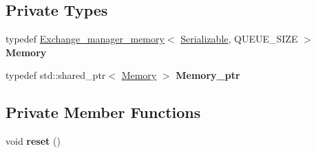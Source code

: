 \subsection*{Private Types}
\begin{DoxyCompactItemize}
\item 
\mbox{\label{classshared__memory_1_1Exchange__manager__consumer_a1699ba86d1d5b943d428fc1b391abd42}} 
typedef \hyperlink{classshared__memory_1_1internal_1_1Exchange__manager__memory}{Exchange\+\_\+manager\+\_\+memory}$<$ \hyperlink{classSerializable}{Serializable}, Q\+U\+E\+U\+E\+\_\+\+S\+I\+ZE $>$ {\bfseries Memory}
\item 
\mbox{\label{classshared__memory_1_1Exchange__manager__consumer_a92ad5c787b53c26d5b3c75712ca539f3}} 
typedef std\+::shared\+\_\+ptr$<$ \hyperlink{classshared__memory_1_1internal_1_1Exchange__manager__memory}{Memory} $>$ {\bfseries Memory\+\_\+ptr}
\end{DoxyCompactItemize}
\subsection*{Private Member Functions}
\begin{DoxyCompactItemize}
\item 
\mbox{\label{classshared__memory_1_1Exchange__manager__consumer_a7543d28030c9c3e17b8fd60facc917b2}} 
void {\bfseries reset} ()
\end{DoxyCompactItemize}
